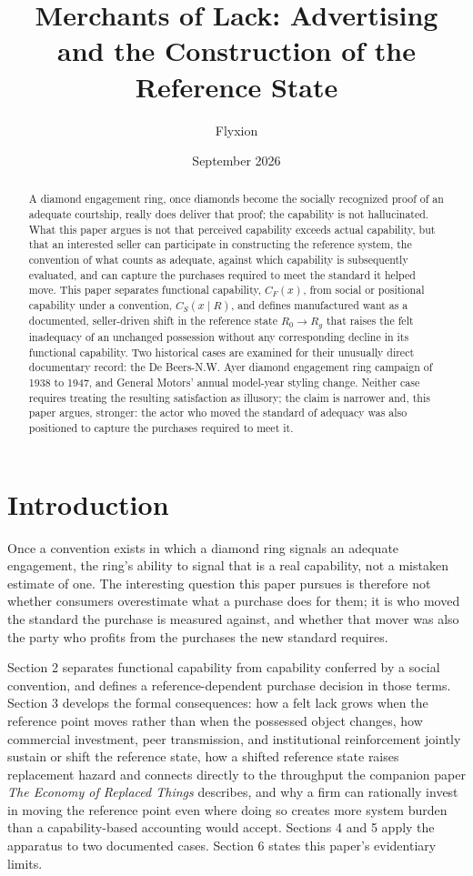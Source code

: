 \documentclass[11pt]{article}
\title{Merchants of Lack: Advertising and the Construction of the Reference State}
\author{Flyxion}
\affil{Independent Researcher}
\date{September 2026}
\begin{document}
\maketitle

\begin{abstract}
A diamond engagement ring, once diamonds become the socially recognized proof of an adequate courtship, really does deliver that proof; the capability is not hallucinated. What this paper argues is not that perceived capability exceeds actual capability, but that an interested seller can participate in constructing the reference system, the convention of what counts as adequate, against which capability is subsequently evaluated, and can capture the purchases required to meet the standard it helped move. This paper separates functional capability, $C_F(x)$, from social or positional capability under a convention, $C_S(x \mid R)$, and defines manufactured want as a documented, seller-driven shift in the reference state $R_0 \to R_g$ that raises the felt inadequacy of an unchanged possession without any corresponding decline in its functional capability. Two historical cases are examined for their unusually direct documentary record: the De Beers-N.W. Ayer diamond engagement ring campaign of 1938 to 1947, and General Motors' annual model-year styling change. Neither case requires treating the resulting satisfaction as illusory; the claim is narrower and, this paper argues, stronger: the actor who moved the standard of adequacy was also positioned to capture the purchases required to meet it.
\end{abstract}

\section{Introduction}

Once a convention exists in which a diamond ring signals an adequate engagement, the ring's ability to signal that is a real capability, not a mistaken estimate of one. The interesting question this paper pursues is therefore not whether consumers overestimate what a purchase does for them; it is who moved the standard the purchase is measured against, and whether that mover was also the party who profits from the purchases the new standard requires.

Section 2 separates functional capability from capability conferred by a social convention, and defines a reference-dependent purchase decision in those terms. Section 3 develops the formal consequences: how a felt lack grows when the reference point moves rather than when the possessed object changes, how commercial investment, peer transmission, and institutional reinforcement jointly sustain or shift the reference state, how a shifted reference state raises replacement hazard and connects directly to the throughput the companion paper \emph{The Economy of Replaced Things} describes, and why a firm can rationally invest in moving the reference point even where doing so creates more system burden than a capability-based accounting would accept. Sections 4 and 5 apply the apparatus to two documented cases. Section 6 states this paper's evidentiary limits.
\end{document}
